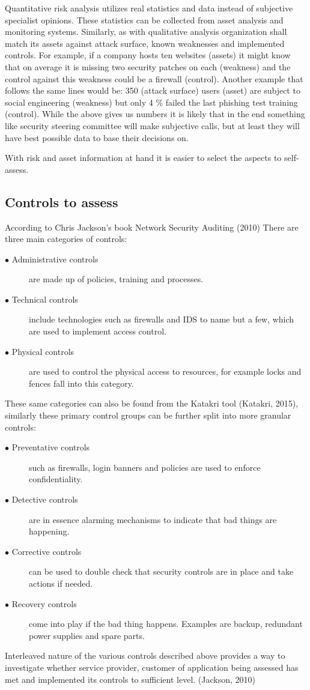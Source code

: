 \documentclass{article}
\begin{document}
\par
Quantitative risk analysis utilizes real statistics and data instead of subjective specialist opinions. These statistics can be collected from asset analysis and monitoring systems.
Similarly, as with qualitative analysis organization shall match its assets against attack surface, known weaknesses and implemented controls. For example, if a company hosts ten websites (assets) it might know that on average it is missing two security patches on each (weakness) and the control against this weakness could be a firewall (control). Another example that follows the same lines would be: 350 (attack surface) users (asset) are subject to social engineering (weakness) but only 4 \% failed the last phishing test training (control).
While the above gives us numbers it is likely that in the end something like security steering committee will make subjective calls, but at least they will have best possible data to base their decisions on.
\par
With risk and asset information at hand it is easier to select the aspects to self-assess. 
\subsection{Controls to assess}
According to Chris Jackson's book Network Security Auditing (2010) There are three main categories of controls:
\begin{description}
	\item[$\bullet$ Administrative controls] are made up of policies, training and processes.
	\item[$\bullet$ Technical controls] include technologies such as firewalls and IDS to name but a few, which are used to implement access control.
	\item[$\bullet$ Physical controls] are used to control the physical access to resources, for example locks and fences fall into this category.
\end{description}
These same categories can also be found from the Katakri tool (Katakri, 2015), similarly these primary control groups can be further split into more granular controls:
\begin{description}
	\item[$\bullet$ Preventative controls] such as firewalls, login banners and policies are used to enforce confidentiality.
	\item[$\bullet$ Detective controls] are in essence alarming mechanisms to indicate that bad things are happening.
	\item[$\bullet$ Corrective controls] can be used to double check that security controls are in place and take actions if needed.
	\item[$\bullet$ Recovery controls] come into play if the bad thing happens. Examples are backup, redundant power supplies and spare parts.
\end{description}
Interleaved nature of the various controls described above provides a way to investigate whether service provider, customer of application being assessed has met and implemented its controls to sufficient level. (Jackson, 2010)
\end{document}
